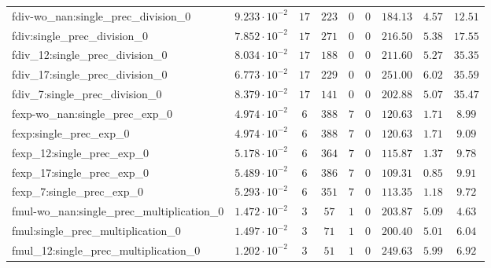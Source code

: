 \begin{tabular}{|l|c|c|c|c|c|c|c|c|}
fdiv-wo\_nan:single\_prec\_division\_0         & $ 9.233 \cdot 10^{-2} $ & $ 17     $ & $ 223   $ & $ 0   $ & $ 0      $ & $ 184.13      $ & $ 4.57    $ & $ 12.51   $ \\
fdiv:single\_prec\_division\_0                 & $ 7.852 \cdot 10^{-2} $ & $ 17     $ & $ 271   $ & $ 0   $ & $ 0      $ & $ 216.50      $ & $ 5.38    $ & $ 17.55   $ \\
fdiv\_12:single\_prec\_division\_0             & $ 8.034 \cdot 10^{-2} $ & $ 17     $ & $ 188   $ & $ 0   $ & $ 0      $ & $ 211.60      $ & $ 5.27    $ & $ 35.35   $ \\
fdiv\_17:single\_prec\_division\_0             & $ 6.773 \cdot 10^{-2} $ & $ 17     $ & $ 229   $ & $ 0   $ & $ 0      $ & $ 251.00      $ & $ 6.02    $ & $ 35.59   $ \\
fdiv\_7:single\_prec\_division\_0              & $ 8.379 \cdot 10^{-2} $ & $ 17     $ & $ 141   $ & $ 0   $ & $ 0      $ & $ 202.88      $ & $ 5.07    $ & $ 35.47   $ \\
fexp-wo\_nan:single\_prec\_exp\_0              & $ 4.974 \cdot 10^{-2} $ & $ 6      $ & $ 388   $ & $ 7   $ & $ 0      $ & $ 120.63      $ & $ 1.71    $ & $ 8.99    $ \\
fexp:single\_prec\_exp\_0                      & $ 4.974 \cdot 10^{-2} $ & $ 6      $ & $ 388   $ & $ 7   $ & $ 0      $ & $ 120.63      $ & $ 1.71    $ & $ 9.09    $ \\
fexp\_12:single\_prec\_exp\_0                  & $ 5.178 \cdot 10^{-2} $ & $ 6      $ & $ 364   $ & $ 7   $ & $ 0      $ & $ 115.87      $ & $ 1.37    $ & $ 9.78    $ \\
fexp\_17:single\_prec\_exp\_0                  & $ 5.489 \cdot 10^{-2} $ & $ 6      $ & $ 386   $ & $ 7   $ & $ 0      $ & $ 109.31      $ & $ 0.85    $ & $ 9.91    $ \\
fexp\_7:single\_prec\_exp\_0                   & $ 5.293 \cdot 10^{-2} $ & $ 6      $ & $ 351   $ & $ 7   $ & $ 0      $ & $ 113.35      $ & $ 1.18    $ & $ 9.72    $ \\
fmul-wo\_nan:single\_prec\_multiplication\_0   & $ 1.472 \cdot 10^{-2} $ & $ 3      $ & $ 57    $ & $ 1   $ & $ 0      $ & $ 203.87      $ & $ 5.09    $ & $ 4.63    $ \\
fmul:single\_prec\_multiplication\_0           & $ 1.497 \cdot 10^{-2} $ & $ 3      $ & $ 71    $ & $ 1   $ & $ 0      $ & $ 200.40      $ & $ 5.01    $ & $ 6.04    $ \\
fmul\_12:single\_prec\_multiplication\_0       & $ 1.202 \cdot 10^{-2} $ & $ 3      $ & $ 51    $ & $ 1   $ & $ 0      $ & $ 249.63      $ & $ 5.99    $ & $ 6.92    $ \\

\end{tabular}
